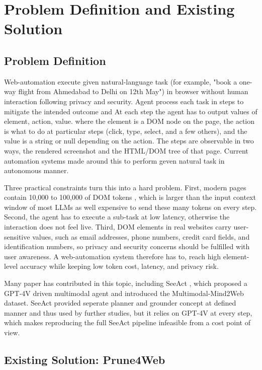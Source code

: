 \chapter{Problem Definition and Existing Solution}

\section{Problem Definition}
Web-automation execute given natural-language task (for example, "book a one-way flight from Ahmedabad to Delhi on 12th May") in browser without human interaction following privacy and security. Agent process each task in steps to mitigate the intended outcome and At each step the agent has to output values of element, action, value. where the element is a DOM node on the page, the action is what to do at particular steps (click, type, select, and a few others), and the value is a string or null depending on the action. The steps are observable in two ways, the rendered screenshot and the HTML/DOM tree of that page. Current automation systems made around this to perform geven natural task in autonomous manner.

Three practical constraints turn this into a hard problem. First, modern pages contain 10,000 to 100,000 of DOM tokens \cite{zhang2025prune4web}, which is larger than the input context window of most LLMs as well expensive to send these many tokens on every step. Second, the agent has to execute a sub-task at low latency, otherwise the interaction does not feel live. Third, DOM elements in real websites carry user-sensitive values, such as email addresses, phone numbers, credit card fields, and identification numbers, so privacy and security concerns should be fulfilled with user awareness. A web-automation system therefore has to, reach high element-level accuracy while keeping low token cost, latency, and privacy risk.

Many paper has contributed in this topic, including SeeAct \cite{SeeAct}, which proposed a GPT-4V driven multimodal agent and introduced the Multimodal-Mind2Web dataset. SeeAct provided seperate planner and grounder concept at defined manner and thus used by further studies, but it relies on GPT-4V at every step, which makes reproducing the full SeeAct pipeline infeasible from a cost point of view.  

\section{Existing Solution: Prune4Web}

